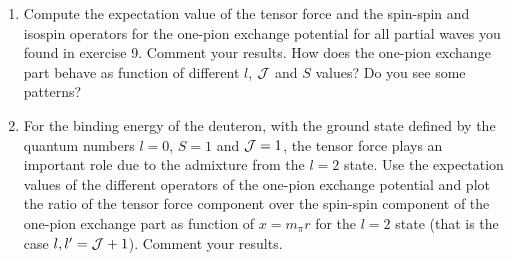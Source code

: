\documentclass[%
twoside,                 %
final,                   %
10pt]{article}
\begin{document}
\begin{enumerate}
\item Compute the expectation value of the tensor force and the spin-spin  and isospin operators for the one-pion exchange potential for all partial waves you found in exercise 9. Comment your results. How does the one-pion exchange part behave as function of different $l$, ${\cal J}$ and $S$ values? Do you see some patterns?

\item For the binding energy of the deuteron, with the ground state defined by the quantum numbers $l=0$, $S=1$ and ${\cal J}=1$, the tensor force plays an important role due to the admixture from the $l=2$ state. Use the expectation values of the different operators of the one-pion exchange potential and plot the ratio of the tensor force component over the spin-spin component of the one-pion exchange part as function of $x=m_\pi r$ for the $l=2$ state (that is the case $l,l'={\cal J}+1$). Comment your results. 
\end{enumerate}

\noindent







\printindex
\end{document}
